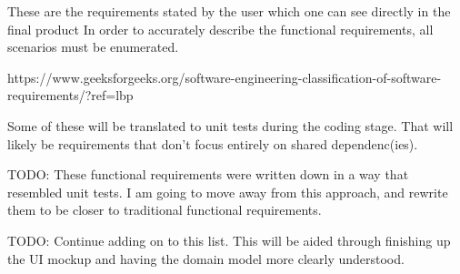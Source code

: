
\label{ch: functional}

These are the requirements stated by the user which one can see directly in the final product
In order to accurately describe the functional requirements, all scenarios must be enumerated.

https://www.geeksforgeeks.org/software-engineering-classification-of-software-requirements/?ref=lbp

Some of these will be translated to unit tests during the coding stage. That will likely be requirements that don't focus entirely on shared dependenc(ies).


TODO: These functional requirements were written down in a way that resembled unit tests. I am going to move away from this approach, and rewrite them to be closer to traditional functional requirements. 

TODO: Continue adding on to this list. This will be aided through finishing up the UI mockup and having the domain model more clearly understood.